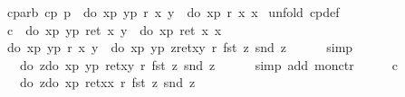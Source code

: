 \begin{isabellebody}
\begin{isamarkuptext}
\end{isamarkuptext}%
\isamarkuptrue%
\ cp{\isacharunderscore}arb{\isacharcolon}\ {\isachardoublequote}cp\ p\ {\isasymLongrightarrow}\ do\ {\isacharbraceleft}x{\isasymleftarrow}p{\isacharsemicolon}\ y{\isasymleftarrow}p{\isacharsemicolon}\ r\ x\ y{\isacharbraceright}\ {\isacharequal}\ do\ {\isacharbraceleft}x{\isasymleftarrow}p{\isacharsemicolon}\ r\ x\ x{\isacharbraceright}{\isachardoublequote}\isanewline
\isamarkupfalse%
\ {\isacharparenleft}unfold\ cp{\isacharunderscore}def{\isacharparenright}\isanewline
\ \ \isamarkupfalse%
\ c{\isacharcolon}\ {\isachardoublequote}\ do\ {\isacharbraceleft}x{\isasymleftarrow}p{\isacharsemicolon}\ y{\isasymleftarrow}p{\isacharsemicolon}\ ret\ {\isacharparenleft}x{\isacharcomma}\ y{\isacharparenright}{\isacharbraceright}\ {\isacharequal}\ do\ {\isacharbraceleft}x{\isasymleftarrow}p{\isacharsemicolon}\ ret\ {\isacharparenleft}x{\isacharcomma}\ x{\isacharparenright}{\isacharbraceright}{\isachardoublequote}\isanewline
\ \ \isamarkupfalse%
\ {\isachardoublequote}do\ {\isacharbraceleft}x{\isasymleftarrow}p{\isacharsemicolon}\ y{\isasymleftarrow}p{\isacharsemicolon}\ r\ x\ y{\isacharbraceright}\ {\isacharequal}\ do\ {\isacharbraceleft}x{\isasymleftarrow}p{\isacharsemicolon}\ y{\isasymleftarrow}p{\isacharsemicolon}\ z{\isasymleftarrow}ret{\isacharparenleft}x{\isacharcomma}y{\isacharparenright}{\isacharsemicolon}\ r\ {\isacharparenleft}fst\ z{\isacharparenright}\ {\isacharparenleft}snd\ z{\isacharparenright}{\isacharbraceright}{\isachardoublequote}\isanewline
\ \ \ \ \isamarkupfalse%
\ {\isacharparenleft}simp{\isacharparenright}\isanewline
\ \ \isamarkupfalse%
\ \isamarkupfalse%
\ {\isachardoublequote}{\isasymdots}\ {\isacharequal}\ do\ {\isacharbraceleft}z{\isasymleftarrow}do\ {\isacharbraceleft}x{\isasymleftarrow}p{\isacharsemicolon}\ y{\isasymleftarrow}p{\isacharsemicolon}\ ret{\isacharparenleft}x{\isacharcomma}y{\isacharparenright}{\isacharbraceright}{\isacharsemicolon}\ r\ {\isacharparenleft}fst\ z{\isacharparenright}\ {\isacharparenleft}snd\ z{\isacharparenright}{\isacharbraceright}{\isachardoublequote}\isanewline
\ \ \ \ \isamarkupfalse%
\ {\isacharparenleft}simp\ add{\isacharcolon}\ mon{\isacharunderscore}ctr{\isacharparenright}\isanewline
\ \ \isamarkupfalse%
\ \isamarkupfalse%
\ c\ \isamarkupfalse%
\ {\isachardoublequote}{\isasymdots}\ {\isacharequal}\ do\ {\isacharbraceleft}z{\isasymleftarrow}do\ {\isacharbraceleft}x{\isasymleftarrow}p{\isacharsemicolon}\ ret{\isacharparenleft}x{\isacharcomma}x{\isacharparenright}{\isacharbraceright}{\isacharsemicolon}\ r\ {\isacharparenleft}fst\ z{\isacharparenright}\ {\isacharparenleft}snd\ z{\isacharparenright}{\isacharbraceright}{\isachardoublequote}\isanewline

\end{isabellebody}
